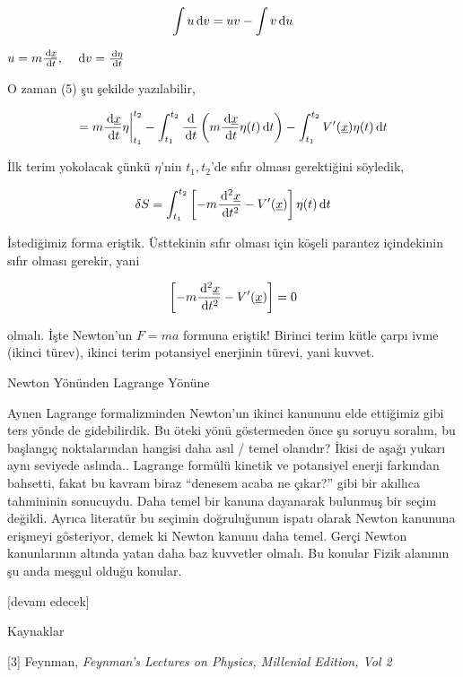 \documentclass[12pt,fleqn]{article}\usepackage{../../common}
\begin{document}
$$ 
\int u \,\mathrm{d} v = uv - \int v \,\mathrm{d} u
$$

$u = m \frac{\,\mathrm{d}\underline{x}}{\,\mathrm{d} t}, \quad \,\mathrm{d} v = \frac{\,\mathrm{d} \eta}{\,\mathrm{d} t}$

O zaman (5) şu şekilde yazılabilir,

$$ 
= m \frac{\,\mathrm{d} \underline{x}}{\,\mathrm{d} t} \eta \bigg\vert_{t_1}^{t_2} 
- \int_{t_1}^{t_2} \frac{\,\mathrm{d}}{\,\mathrm{d} t} \left( m \frac{\,\mathrm{d} \underline{x}}{\,\mathrm{d} t} \eta(t) \,\mathrm{d} t\right)
- \int_{t_1}^{t_2} V'(\underline{x}) \eta(t) \,\mathrm{d} t
$$

İlk terim yokolacak çünkü $\eta$'nin $t_1,t_2$'de sıfır olması gerektiğini söyledik,

$$ 
\delta S = 
\int_{t_1}^{t_2} \left[ 
-m \frac{\,\mathrm{d}^2 \underline{x}}{\,\mathrm{d} t^2} - V'(\underline{x})
\right] 
\eta(t) \,\mathrm{d} t
$$

İstediğimiz forma eriştik. Üsttekinin sıfır olması için köşeli parantez
içindekinin sıfır olması gerekir, yani

$$ 
\left[ 
-m \frac{\,\mathrm{d}^2 \underline{x}}{\,\mathrm{d} t^2} - V'(\underline{x})
\right]  = 0
$$

olmalı. İşte Newton'un $F = ma$ formuna eriştik! Birinci terim kütle çarpı
ivme (ikinci türev), ikinci terim potansiyel enerjinin türevi, yani kuvvet.

Newton Yönünden Lagrange Yönüne

Aynen Lagrange formalizminden Newton'un ikinci kanununu elde ettiğimiz gibi ters
yönde de gidebilirdik. Bu öteki yönü göstermeden önce şu soruyu soralım, bu
başlangıç noktalarından hangisi daha asıl / temel olanıdır? İkisi de aşağı
yukarı aynı seviyede aslında.. Lagrange formülü kinetik ve potansiyel enerji
farkından bahsetti, fakat bu kavram biraz ``denesem acaba ne çıkar?'' gibi bir
akıllıca tahmininin sonucuydu. Daha temel bir kanuna dayanarak bulunmuş bir
seçim değildi. Ayrıca literatür bu seçimin doğruluğunun ispatı olarak Newton
kanununa erişmeyi gösteriyor, demek ki Newton kanunu daha temel. Gerçi Newton
kanunlarının altında yatan daha baz kuvvetler olmalı. Bu konular Fizik alanının
şu anda meşgul olduğu konular.





[devam edecek]

Kaynaklar 

[3] Feynman, {\em Feynman's Lectures on Physics, Millenial Edition, Vol 2} 
\end{document}
